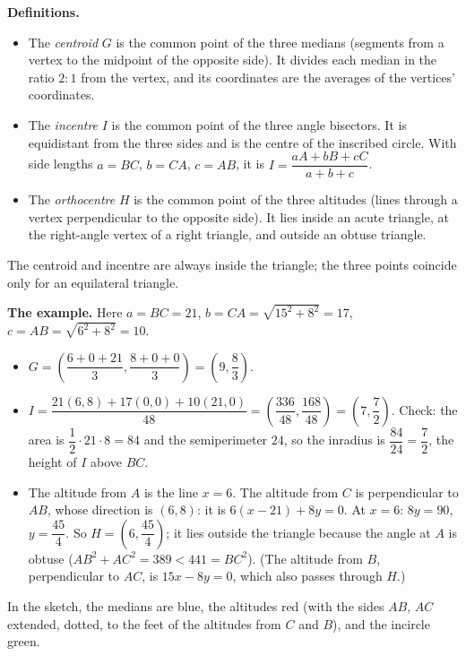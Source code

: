\textbf{Definitions.}
\begin{itemize}
\item The \emph{centroid} $G$ is the common point of the three medians (segments from a vertex to the midpoint of the opposite side). It divides each median in the ratio $2:1$ from the vertex, and its coordinates are the averages of the vertices' coordinates.
\item The \emph{incentre} $I$ is the common point of the three angle bisectors. It is equidistant from the three sides and is the centre of the inscribed circle. With side lengths $a=BC$, $b=CA$, $c=AB$, it is $I=\dfrac{aA+bB+cC}{a+b+c}$.
\item The \emph{orthocentre} $H$ is the common point of the three altitudes (lines through a vertex perpendicular to the opposite side). It lies inside an acute triangle, at the right-angle vertex of a right triangle, and outside an obtuse triangle.
\end{itemize}
The centroid and incentre are always inside the triangle; the three points coincide only for an equilateral triangle.

\textbf{The example.} Here $a=BC=21$, $b=CA=\sqrt{15^2+8^2}=17$, $c=AB=\sqrt{6^2+8^2}=10$.
\begin{itemize}
\item $G=\left(\dfrac{6+0+21}{3},\dfrac{8+0+0}{3}\right)=\boxed{\left(9,\dfrac{8}{3}\right)}$.
\item $I=\dfrac{21(6,8)+17(0,0)+10(21,0)}{48}=\left(\dfrac{336}{48},\dfrac{168}{48}\right)=\boxed{\left(7,\dfrac{7}{2}\right)}$. Check: the area is $\dfrac{1}{2}\cdot21\cdot8=84$ and the semiperimeter $24$, so the inradius is $\dfrac{84}{24}=\dfrac{7}{2}$, the height of $I$ above $BC$.
\item The altitude from $A$ is the line $x=6$. The altitude from $C$ is perpendicular to $AB$, whose direction is $(6,8)$: it is $6(x-21)+8y=0$. At $x=6$: $8y=90$, $y=\dfrac{45}{4}$. So $H=\boxed{\left(6,\dfrac{45}{4}\right)}$; it lies outside the triangle because the angle at $A$ is obtuse ($AB^2+AC^2=389<441=BC^2$). (The altitude from $B$, perpendicular to $AC$, is $15x-8y=0$, which also passes through $H$.)
\end{itemize}
In the sketch, the medians are blue, the altitudes red (with the sides $AB$, $AC$ extended, dotted, to the feet of the altitudes from $C$ and $B$), and the incircle green.

